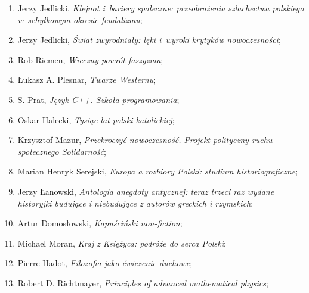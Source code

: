 \documentclass[a4paper,11pt]{article}
\begin{document}
\begin{enumerate}
\item Jerzy Jedlicki, \textit{Klejnot i~bariery społeczne: przeobrażenia
    szlachectwa polskiego w~schyłkowym okresie feudalizmu};



\item Jerzy Jedlicki, \textit{Świat zwyrodniały: lęki i~wyroki krytyków
    nowoczesności};



\item Rob Riemen, \textit{Wieczny powrót faszyzmu};



\item Łukasz A. Plesnar, \textit{Twarze Westernu};



\item S. Prat, \textit{Język C++. Szkoła programowania};



\item Oskar Halecki, \textit{Tysiąc lat polski katolickiej};



\item Krzysztof Mazur, \textit{Przekroczyć nowoczesność. Projekt
    polityczny ruchu społecznego Solidarność};



\item Marian Henryk Serejski, \textit{Europa a rozbiory Polski: studium
    historiograficzne};



\item Jerzy Łanowski, \textit{Antologia anegdoty antycznej: teraz trzeci
    raz wydane historyjki budujące i niebudujące z autorów greckich i
    rzymskich};



\item Artur Domosłowski, \textit{Kapuściński non-fiction};



\item Michael Moran, \textit{Kraj z Księżyca: podróże do serca Polski};



\item Pierre Hadot, \textit{Filozofia jako ćwiczenie duchowe};



\item Robert D. Richtmayer, \textit{Principles of advanced mathematical
    physics};




\end{enumerate}
\end{document}
